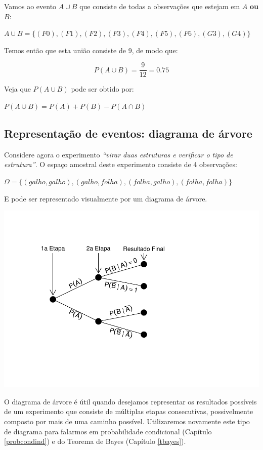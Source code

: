 \documentclass[
]{book}
\begin{document}
Vamos ao evento \(A \cup B\) que consiste de todas a observações que estejam em \(A\) \textbf{ou} \(B\):

\(A \cup B = \{(F0),(F1),(F2),(F3),(F4),(F5),(F6),(G3),(G4) \}\)

Temos então que esta união consiste de 9, de modo que:

\[P(A \cup B) = \frac{9}{12} = 0.75\]

Veja que \(P(A \cup B)\) pode ser obtido por:

\(P(A \cup B) = P(A) + P(B) - P(A \cap B)\)

\hypertarget{representauxe7uxe3o-de-eventos-diagrama-de-uxe1rvore}{%
\subsection{Representação de eventos: diagrama de árvore}\label{representauxe7uxe3o-de-eventos-diagrama-de-uxe1rvore}}

Considere agora o experimento \emph{``virar duas estruturas e verificar o tipo de estrutura''}. O espaço amostral deste experimento consiste de 4 observações:

\(\Omega = \{(galho, galho), (galho, folha), (folha, galho), (folha, folha)\}\)

E pode ser representado visualmente por um diagrama de árvore.

\includegraphics{probest-cambientais_files/figure-latex/unnamed-chunk-189-1.pdf}

O diagrama de árvore é útil quando desejamos representar os resultados possíveis de um experimento que consiste de múltiplas etapas consecutivas, possivelmente composto por mais de uma caminho possível. Utilizaremos novamente este tipo de diagrama para falarmos em probabilidade condicional (Capítulo \ref{probcondind}) e do Teorema de Bayes (Capítulo \ref{tbayes}).
\end{document}
